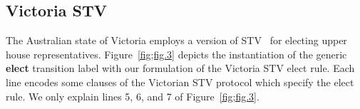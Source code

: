 \documentclass{llncs}
\begin{document}
\subsection{Victoria STV}
The Australian state of Victoria employs a version of
STV~\cite{PV:2002:EA} for  electing upper house representatives. 
Figure~\ref{fig;fig.3} depicts the instantiation of the generic
\textbf{elect} transition label with our formulation of the Victoria
STV elect rule. Each line 
encodes some clauses of the Victorian STV protocol
which specify the elect rule.  We only explain lines 5, 6, and 7 of
Figure~\ref{fig;fig.3}.
\end{document}
